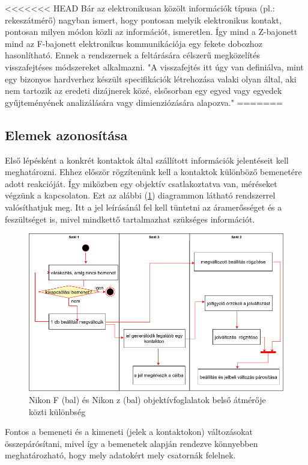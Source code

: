 <<<<<<< HEAD
Bár az elektronikusan közölt információk típusa (pl.: rekeszátmérő) nagyban ismert, hogy pontosan melyik elektronikus kontakt, pontosan milyen módon közli az információt, ismeretlen. Így mind a Z-bajonett mind az F-bajonett elektronikus kommunikációja egy fekete dobozhoz hasonlítható. Ennek a rendszernek a feltárására célszerű megközelítés visszafejtéses módszereket alkalmazni. "A visszafejtés itt úgy van definiálva, mint egy bizonyos hardverhez készült specifikációk létrehozása valaki olyan által, aki nem tartozik az eredeti dizájnerek közé, elsősorban egy egyed vagy egyedek gyűjteményének analizálására vagy dimienziózására alapozva."\cite{Reverse_engineering}
=======
\subsection{Elemek azonosítása}
Első lépésként a konkrét kontaktok által szállított információk jelentéseit kell meghatározni. Ehhez először rögzítenünk kell a kontaktok különböző bemenetére adott reakcióját. Így miközben egy objektív csatlakoztatva van, méréseket végzünk a kapcsolaton. Ezt az alábbi (\ref{fig:jelparosito_UML}) diagrammon látható rendszerrel valósíthatjuk meg. Itt a jel leírásánál fel kell tüntetni az áramerősséget és a feszültséget is, mivel mindkettő tartalmazhat szükséges információt.
\begin{figure}[H]
	\centering
	\includegraphics[width=1.0\linewidth]{img/Reverse_2.drawio.png}
	\caption{Nikon F (bal) és Nikon z (bal) objektívfoglalatok belső átmérője közti különbség}
	\label{fig:jelparosito_UML}
\end{figure}
Fontos a bemeneti és a kimeneti (jelek a kontaktokon) változásokat összepárósítani, mivel így a bemenetek alapján rendezve könnyebben meghatározható, hogy mely adatokért mely csatornák felelnek.
